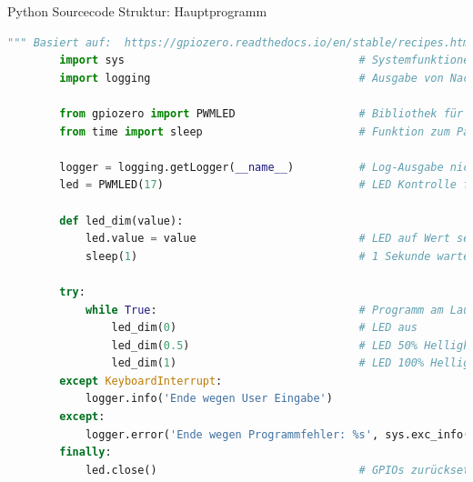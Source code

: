 \begin{frame}[fragile]{Python Sourcecode Struktur: Hauptprogramm}
    \begin{lstlisting}[language=Python, gobble=8]
        """ Basiert auf:  https://gpiozero.readthedocs.io/en/stable/recipes.html """
        import sys                                    # Systemfunktionen
        import logging                                # Ausgabe von Nachrichten

        from gpiozero import PWMLED                   # Bibliothek für PWM-Ansteuerung
        from time import sleep                        # Funktion zum Pausieren

        logger = logging.getLogger(__name__)          # Log-Ausgabe nicht mit print()
        led = PWMLED(17)                              # LED Kontrolle für GPIO PIN 17

        def led_dim(value):
            led.value = value                         # LED auf Wert setzen
            sleep(1)                                  # 1 Sekunde warten

        try:
            while True:                               # Programm am Laufen halten
                led_dim(0)                            # LED aus
                led_dim(0.5)                          # LED 50% Helligkeit
                led_dim(1)                            # LED 100% Helligkeit
        except KeyboardInterrupt:
            logger.info('Ende wegen User Eingabe')
        except:
            logger.error('Ende wegen Programmfehler: %s', sys.exc_info()[0])
        finally:
            led.close()                               # GPIOs zurücksetzen
    \end{lstlisting}
\end{frame}

